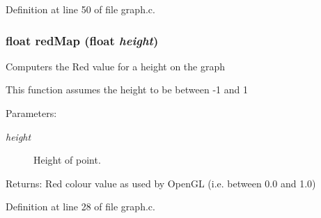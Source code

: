 Definition at line 50 of file graph.c.
\subsubsection{\setlength{\rightskip}{0pt plus 5cm}float red\-Map (float {\em height})}\label{graph_8h_a1}


Computers the Red value for a height on the graph

This function assumes the height to be between -1 and 1 \begin{Desc}
\item[Parameters:]
\begin{description}
\item[{\em height}]Height of point. \end{description}
\end{Desc}
\begin{Desc}
\item[Returns:]Red colour value as used by Open\-GL (i.e. between 0.0 and 1.0) \end{Desc}


Definition at line 28 of file graph.c.